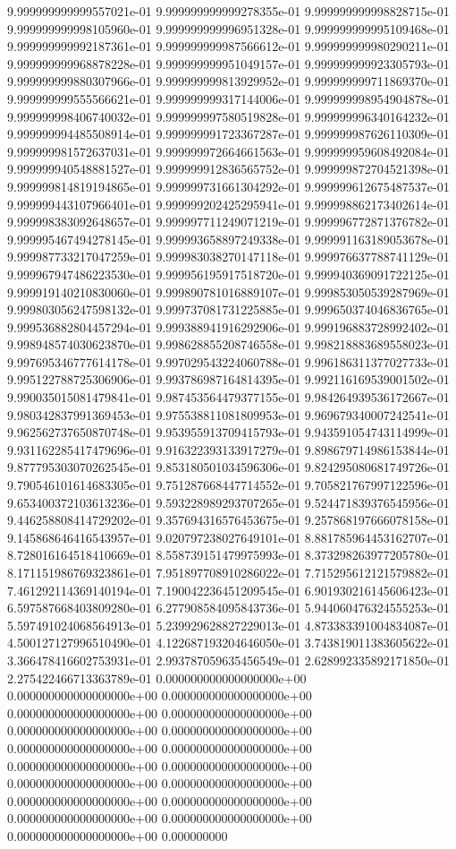 9.999999999999557021e-01	9.999999999999278355e-01	9.999999999998828715e-01	9.999999999998105960e-01	9.999999999996951328e-01	9.999999999995109468e-01	9.999999999992187361e-01	9.999999999987566612e-01	9.999999999980290211e-01	9.999999999968878228e-01	9.999999999951049157e-01	9.999999999923305793e-01	9.999999999880307966e-01	9.999999999813929952e-01	9.999999999711869370e-01	9.999999999555566621e-01	9.999999999317144006e-01	9.999999998954904878e-01	9.999999998406740032e-01	9.999999997580519828e-01	9.999999996340164232e-01	9.999999994485508914e-01	9.999999991723367287e-01	9.999999987626110309e-01	9.999999981572637031e-01	9.999999972664661563e-01	9.999999959608492084e-01	9.999999940548881527e-01	9.999999912836565752e-01	9.999999872704521398e-01	9.999999814819194865e-01	9.999999731661304292e-01	9.999999612675487537e-01	9.999999443107966401e-01	9.999999202425295941e-01	9.999998862173402614e-01	9.999998383092648657e-01	9.999997711249071219e-01	9.999996772871376782e-01	9.999995467494278145e-01	9.999993658897249338e-01	9.999991163189053678e-01	9.999987733217047259e-01	9.999983038270147118e-01	9.999976637788741129e-01	9.999967947486223530e-01	9.999956195917518720e-01	9.999940369091722125e-01	9.999919140210830060e-01	9.999890781016889107e-01	9.999853050539287969e-01	9.999803056247598132e-01	9.999737081731225885e-01	9.999650374046836765e-01	9.999536882804457294e-01	9.999388941916292906e-01	9.999196883728992402e-01	9.998948574030623870e-01	9.998628855208746558e-01	9.998218883689558023e-01	9.997695346777614178e-01	9.997029543224060788e-01	9.996186311377027733e-01	9.995122788725306906e-01	9.993786987164814395e-01	9.992116169539001502e-01	9.990035015081479841e-01	9.987453564479377155e-01	9.984264939536172667e-01	9.980342837991369453e-01	9.975538811081809953e-01	9.969679340007242541e-01	9.962562737650870748e-01	9.953955913709415793e-01	9.943591054743114999e-01	9.931162285417479696e-01	9.916322393133917279e-01	9.898679714986153844e-01	9.877795303070262545e-01	9.853180501034596306e-01	9.824295080681749726e-01	9.790546101614683305e-01	9.751287668447714552e-01	9.705821767997122596e-01	9.653400372103613236e-01	9.593228989293707265e-01	9.524471839376545956e-01	9.446258808414729202e-01	9.357694316576453675e-01	9.257868197666078158e-01	9.145868646416543957e-01	9.020797238027649101e-01	8.881785964453162707e-01	8.728016164518410669e-01	8.558739151479975993e-01	8.373298263977205780e-01	8.171151986769323861e-01	7.951897708910286022e-01	7.715295612121579882e-01	7.461292114369140194e-01	7.190042236451209545e-01	6.901930216145606423e-01	6.597587668403809280e-01	6.277908584095843736e-01	5.944060476324555253e-01	5.597491024068564913e-01	5.239929628827229013e-01	4.873383391004834087e-01	4.500127127996510490e-01	4.122687193204646050e-01	3.743819011383605622e-01	3.366478416602753931e-01	2.993787059635456549e-01	2.628992335892171850e-01	2.275422466713363789e-01	0.000000000000000000e+00	0.000000000000000000e+00	0.000000000000000000e+00	0.000000000000000000e+00	0.000000000000000000e+00	0.000000000000000000e+00	0.000000000000000000e+00	0.000000000000000000e+00	0.000000000000000000e+00	0.000000000000000000e+00	0.000000000000000000e+00	0.000000000000000000e+00	0.000000000000000000e+00	0.000000000000000000e+00	0.000000000000000000e+00	0.000000000000000000e+00	0.000000000000000000e+00	0.000000000000000000e+00	0.000000000